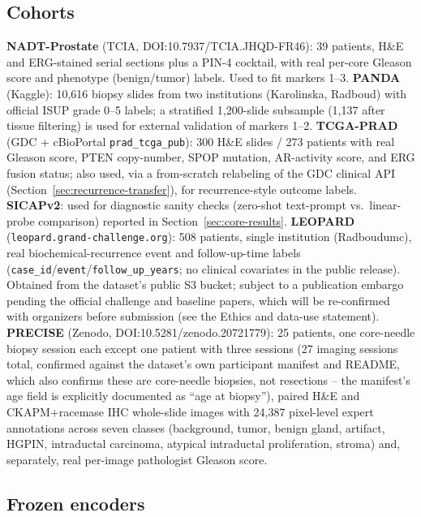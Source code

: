 \label{sec:cohorts}

\subsection{Cohorts}

\textbf{NADT-Prostate} (TCIA, DOI:10.7937/TCIA.JHQD-FR46): 39 patients, H\&E and ERG-stained
serial sections plus a PIN-4 cocktail, with real per-core Gleason score and phenotype
(benign/tumor) labels. Used to fit markers 1--3.
\textbf{PANDA} (Kaggle): 10{,}616 biopsy slides from two institutions (Karolinska, Radboud)
with official ISUP grade 0--5 labels; a stratified 1{,}200-slide subsample (1{,}137 after
tissue filtering) is used for external validation of markers 1--2.
\textbf{TCGA-PRAD} (GDC + cBioPortal \texttt{prad\_tcga\_pub}): 300 H\&E slides / 273 patients
with real Gleason score, PTEN copy-number, SPOP mutation, AR-activity score, and ERG fusion
status; also used, via a from-scratch relabeling of the GDC clinical API
(Section~\ref{sec:recurrence-transfer}), for recurrence-style outcome labels.
\textbf{SICAPv2}: used for diagnostic sanity checks (zero-shot text-prompt vs.\ linear-probe
comparison) reported in Section~\ref{sec:core-results}.
\textbf{LEOPARD} (\texttt{leopard.grand-challenge.org}): 508 patients, single institution
(Radboudumc), real biochemical-recurrence event and follow-up-time labels
(\texttt{case\_id}/\texttt{event}/\texttt{follow\_up\_years}; no clinical covariates in the
public release). Obtained from the dataset's public S3 bucket; subject to a publication
embargo pending the official challenge and baseline papers, which will be re-confirmed with
organizers before submission (see the Ethics and data-use statement).
\textbf{PRECISE} (Zenodo, DOI:10.5281/zenodo.20721779): 25 patients, one core-needle biopsy
session each except one patient with three sessions (27 imaging sessions total, confirmed
against the dataset's own participant manifest and README, which also confirms these are
core-needle biopsies, not resections -- the manifest's age field is explicitly documented as
``age at biopsy''), paired H\&E and CKAPM+racemase IHC whole-slide images with 24{,}387
pixel-level expert annotations across seven classes (background, tumor, benign gland, artifact,
HGPIN, intraductal carcinoma, atypical intraductal proliferation, stroma) and, separately, real
per-image pathologist Gleason score.

\subsection{Frozen encoders}

